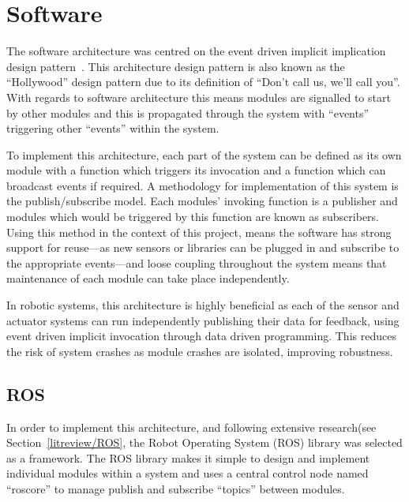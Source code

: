 
\chapter{Software}\label{software}
The software architecture was centred on the event driven implicit implication
design pattern~\cite{garlan1993introduction}. This architecture design pattern is
also known as the ``Hollywood'' design pattern due to its definition of ``Don't
call us, we'll call you''. With regards to software architecture this means
modules are signalled to start by other modules and this is propagated through
the system with ``events'' triggering other ``events'' within the system.

To implement this architecture, each part of the system can be defined as its own
module with a function which triggers its invocation and a function which can
broadcast events if required. A methodology for implementation of this system is
the publish/subscribe model. Each modules' invoking function is a publisher and
modules which would be triggered by this function are known as subscribers. Using
this method in the context of this project, means the software has strong support
for reuse---as new sensors or libraries can be plugged in and subscribe to the
appropriate events---and loose coupling throughout the system means that
maintenance of each module can take place independently.

In robotic systems, this architecture is highly beneficial as each of the sensor
and actuator systems can run independently publishing their data for feedback,
using event driven implicit invocation through data driven programming. This
reduces the risk of system crashes as module crashes are isolated, improving
robustness.

\section{ROS}\label{soft/ROS}
In order to implement this architecture, and following extensive research(see
Section~\ref{litreview/ROS}, the Robot Operating System (ROS) library was
selected as a framework. The ROS library makes it simple to design and implement
individual modules within a system and uses a central control node named
``roscore'' to manage publish and subscribe ``topics'' between modules.

